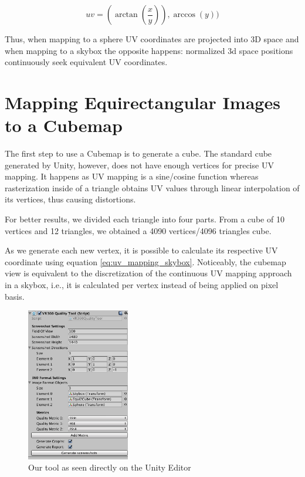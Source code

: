 \documentclass[12pt]{article}
\begin{document}
\begin{equation}
uv = (\arctan(\frac{x}{y})), \arccos(y))
\label{eq:uv_mapping_skybox}
\end{equation}

Thus, when mapping to a sphere UV coordinates are projected into 3D space and when mapping to a skybox the opposite happens: normalized 3d space positions continuously seek equivalent UV coordinates.

\section{Mapping Equirectangular Images to a Cubemap}
The first step to use a Cubemap is to generate a cube. The standard cube generated by Unity, however, does not have enough vertices for precise UV mapping. It happens as UV mapping is a sine/cosine function whereas rasterization inside of a triangle obtains UV values through linear interpolation of its vertices, thus causing distortions.

For better results, we divided each triangle into four parts. From a cube of 10 vertices and 12 triangles, we obtained a 4090 vertices/4096 triangles cube.

As we generate each new vertex, it is possible to calculate its respective UV coordinate using equation \ref{eq:uv_mapping_skybox}. Noticeably, the cubemap view is equivalent to the discretization of the continuous UV mapping approach in a skybox, i.e., it is calculated per vertex instead of being applied on pixel basis.

\begin{figure}
    \centering
    \includegraphics[width=0.4\textwidth]{images/tool.png}
    \caption{Our tool as seen directly on the Unity Editor}
    \label{fig:tool}
\end{figure}
\end{document}
